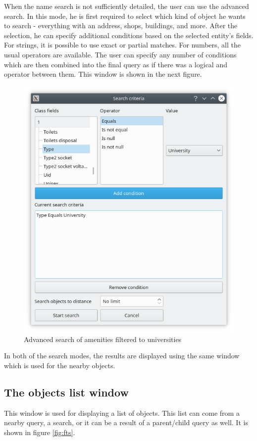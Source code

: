 \documentclass[nolof,digital]{fithesis3}
\begin{document}
When the name search is not sufficiently detailed, the user can use the advanced search. In this mode, he is first required to select which kind of object he wants to search - everything with an address, shops, buildings, and more. After the selection, he can specify additional conditions based on the selected entity's fields. For strings, it is possible to use exact or partial matches. For numbers, all the usual operators are available. The user can specify any number of conditions which are then combined into the final query as if there was a logical and operator between them. This window is shown in the next figure.
\begin{figure}
\caption{Advanced search of amenities filtered to universities}
\includegraphics{fts-amenity-university}
\end{figure}

In both of the search modes, the results are displayed using the same window which is used for the nearby objects.
\subsection{The objects list window}
This window is used for displaying a list of objects. This list can come from a nearby query, a search, or it can be a result of a parent/child query as well. It is shown in figure \ref{fig:fts}.
\end{document}
